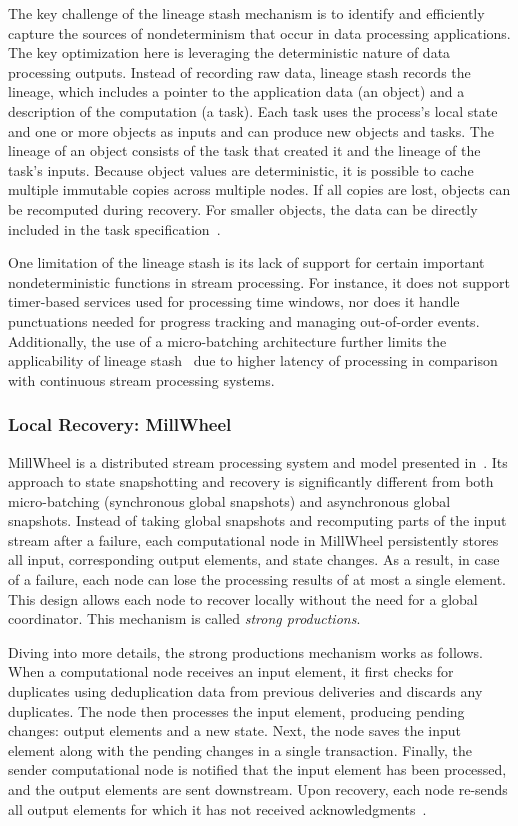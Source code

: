 The key challenge of the lineage stash mechanism is to identify and efficiently capture the sources of nondeterminism that occur in data processing applications. The key optimization here is leveraging the deterministic nature of data processing outputs. Instead of recording raw data, lineage stash records the lineage, which includes a pointer to the application data (an object) and a description of the computation (a task). Each task uses the process's local state and one or more objects as inputs and can produce new objects and tasks. The lineage of an object consists of the task that created it and the lineage of the task's inputs. Because object values are deterministic, it is possible to cache multiple immutable copies across multiple nodes. If all copies are lost, objects can be recomputed during recovery. For smaller objects, the data can be directly included in the task specification~\cite{Wang:2019:LSF:3341301.3359653}.

One limitation of the lineage stash is its lack of support for certain important nondeterministic functions in stream processing. For instance, it does not support timer-based services used for processing time windows, nor does it handle punctuations needed for progress tracking and managing out-of-order events. Additionally, the use of a micro-batching architecture further limits the applicability of lineage stash~\cite{silvestre2021clonos} due to higher latency of processing in comparison with continuous stream processing systems.

\subsubsection{Local Recovery: MillWheel}

MillWheel is a distributed stream processing system and model presented in~\cite{Akidau:2013:MFS:2536222.2536229}. Its approach to state snapshotting and recovery is significantly different from both micro-batching (synchronous global snapshots) and asynchronous global snapshots. Instead of taking global snapshots and recomputing parts of the input stream after a failure, each computational node in MillWheel persistently stores all input, corresponding output elements, and state changes. As a result, in case of a failure, each node can lose the processing results of at most a single element. This design allows each node to recover locally without the need for a global coordinator. This mechanism is called {\em strong productions}.

Diving into more details, the strong productions mechanism works as follows. When a computational node receives an input element, it first checks for duplicates using deduplication data from previous deliveries and discards any duplicates. The node then processes the input element, producing pending changes: output elements and a new state. Next, the node saves the input element along with the pending changes in a single transaction. Finally, the sender computational node is notified that the input element has been processed, and the output elements are sent downstream. Upon recovery, each node re-sends all output elements for which it has not received acknowledgments~\cite{Akidau:2013:MFS:2536222.2536229}.

